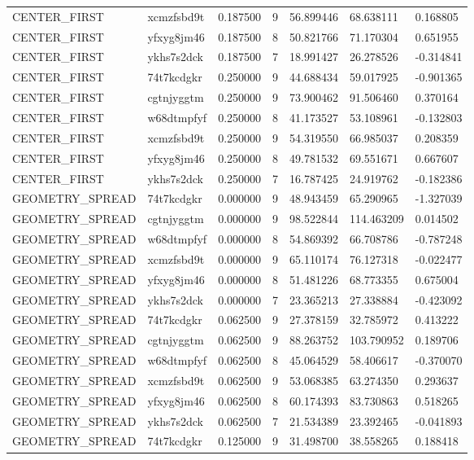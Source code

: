 \begin{tabular}{lllllll}
CENTER\_FIRST & xcmzfsbd9t & 0.187500 & 9 & 56.899446 & 68.638111 & 0.168805 \\
CENTER\_FIRST & yfxyg8jm46 & 0.187500 & 8 & 50.821766 & 71.170304 & 0.651955 \\
CENTER\_FIRST & ykhs7s2dck & 0.187500 & 7 & 18.991427 & 26.278526 & -0.314841 \\
CENTER\_FIRST & 74t7kcdgkr & 0.250000 & 9 & 44.688434 & 59.017925 & -0.901365 \\
CENTER\_FIRST & cgtnjyggtm & 0.250000 & 9 & 73.900462 & 91.506460 & 0.370164 \\
CENTER\_FIRST & w68dtmpfyf & 0.250000 & 8 & 41.173527 & 53.108961 & -0.132803 \\
CENTER\_FIRST & xcmzfsbd9t & 0.250000 & 9 & 54.319550 & 66.985037 & 0.208359 \\
CENTER\_FIRST & yfxyg8jm46 & 0.250000 & 8 & 49.781532 & 69.551671 & 0.667607 \\
CENTER\_FIRST & ykhs7s2dck & 0.250000 & 7 & 16.787425 & 24.919762 & -0.182386 \\
GEOMETRY\_SPREAD & 74t7kcdgkr & 0.000000 & 9 & 48.943459 & 65.290965 & -1.327039 \\
GEOMETRY\_SPREAD & cgtnjyggtm & 0.000000 & 9 & 98.522844 & 114.463209 & 0.014502 \\
GEOMETRY\_SPREAD & w68dtmpfyf & 0.000000 & 8 & 54.869392 & 66.708786 & -0.787248 \\
GEOMETRY\_SPREAD & xcmzfsbd9t & 0.000000 & 9 & 65.110174 & 76.127318 & -0.022477 \\
GEOMETRY\_SPREAD & yfxyg8jm46 & 0.000000 & 8 & 51.481226 & 68.773355 & 0.675004 \\
GEOMETRY\_SPREAD & ykhs7s2dck & 0.000000 & 7 & 23.365213 & 27.338884 & -0.423092 \\
GEOMETRY\_SPREAD & 74t7kcdgkr & 0.062500 & 9 & 27.378159 & 32.785972 & 0.413222 \\
GEOMETRY\_SPREAD & cgtnjyggtm & 0.062500 & 9 & 88.263752 & 103.790952 & 0.189706 \\
GEOMETRY\_SPREAD & w68dtmpfyf & 0.062500 & 8 & 45.064529 & 58.406617 & -0.370070 \\
GEOMETRY\_SPREAD & xcmzfsbd9t & 0.062500 & 9 & 53.068385 & 63.274350 & 0.293637 \\
GEOMETRY\_SPREAD & yfxyg8jm46 & 0.062500 & 8 & 60.174393 & 83.730863 & 0.518265 \\
GEOMETRY\_SPREAD & ykhs7s2dck & 0.062500 & 7 & 21.534389 & 23.392465 & -0.041893 \\
GEOMETRY\_SPREAD & 74t7kcdgkr & 0.125000 & 9 & 31.498700 & 38.558265 & 0.188418 \\

\end{tabular}
